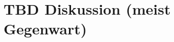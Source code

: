 %
%
\glsresetall
\let\raggedsection\centering
\chapter{TBD Diskussion (meist Gegenwart)}
\let\raggedsection\raggedright 
